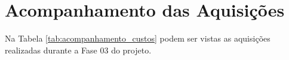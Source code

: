 
\newpage
\section{Acompanhamento das Aquisições}

Na Tabela \ref{tab:acompanhamento_custos} podem ser vistas as aquisições realizadas durante a Fase 03 do projeto.


